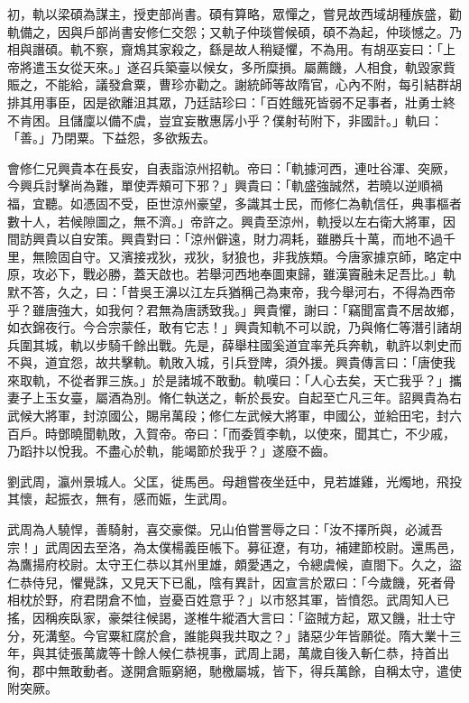 \begin{pinyinscope}
 初，軌以梁碩為謀主，授吏部尚書。碩有算略，眾憚之，嘗見故西域胡種族盛，勸軌備之，因與戶部尚書安修仁交怨；又軌子仲琰嘗候碩，碩不為起，仲琰憾之。乃相與譖碩。軌不察，齎鴆其家殺之，繇是故人稍疑懼，不為用。有胡巫妄曰：「上帝將遣玉女從天來。」遂召兵築臺以候女，多所糜損。屬薦饑，人相食，軌毀家貲賑之，不能給，議發倉粟，曹珍亦勸之。謝統師等故隋官，心內不附，每引結群胡排其用事臣，因是欲離沮其眾，乃廷詰珍曰：「百姓餓死皆弱不足事者，壯勇士終不肯困。且儲廩以備不虞，豈宜妄散惠孱小乎？僕射茍附下，非國計。」軌曰：「善。」乃閉粟。下益怨，多欲叛去。



 會修仁兄興貴本在長安，自表詣涼州招軌。帝曰：「軌據河西，連吐谷渾、突厥，今興兵討擊尚為難，單使弄頰可下邪？」興貴曰：「軌盛強誠然，若曉以逆順禍福，宜聽。如憑固不受，臣世涼州豪望，多識其士民，而修仁為軌信任，典事樞者數十人，若候隙圖之，無不濟。」帝許之。興貴至涼州，軌授以左右衛大將軍，因間訪興貴以自安策。興貴對曰：「涼州僻遠，財力凋耗，雖勝兵十萬，而地不過千里，無險固自守。又濱接戎狄，戎狄，豺狼也，非我族類。今唐家據京師，略定中原，攻必下，戰必勝，蓋天啟也。若舉河西地奉圖東歸，雖漢竇融未足吾比。」軌默不答，久之，曰：「昔吳王濞以江左兵猶稱己為東帝，我今舉河右，不得為西帝乎？雖唐強大，如我何？君無為唐誘致我。」興貴懼，謝曰：「竊聞富貴不居故鄉，如衣錦夜行。今合宗蒙任，敢有它志！」興貴知軌不可以說，乃與脩仁等潛引諸胡兵圍其城，軌以步騎千餘出戰。先是，薛舉柱國奚道宜率羌兵奔軌，軌許以刺史而不與，道宜怨，故共擊軌。軌敗入城，引兵登陴，須外援。興貴傳言曰：「唐使我來取軌，不從者罪三族。」於是諸城不敢動。軌嘆曰：「人心去矣，天亡我乎？」攜妻子上玉女臺，屬酒為別。脩仁執送之，斬於長安。自起至亡凡三年。詔興貴為右武候大將軍，封涼國公，賜帛萬段；修仁左武候大將軍，申國公，並給田宅，封六百戶。時鄧曉聞軌敗，入賀帝。帝曰：「而委質李軌，以使來，聞其亡，不少戚，乃蹈抃以悅我。不盡心於軌，能竭節於我乎？」遂廢不齒。



 劉武周，瀛州景城人。父匡，徙馬邑。母趙嘗夜坐廷中，見若雄雞，光燭地，飛投其懷，起振衣，無有，感而娠，生武周。



 武周為人驍悍，善騎射，喜交豪傑。兄山伯嘗詈辱之曰：「汝不擇所與，必滅吾宗！」武周因去至洛，為太僕楊義臣帳下。募征遼，有功，補建節校尉。還馬邑，為鷹揚府校尉。太守王仁恭以其州里雄，頗愛遇之，令總虞候，直閤下。久之，盜仁恭侍兒，懼覺誅，又見天下已亂，陰有異計，因宣言於眾曰：「今歲饑，死者骨相枕於野，府君閉倉不恤，豈憂百姓意乎？」以市怒其軍，皆憤怨。武周知人已搖，因稱疾臥家，豪桀往候謁，遂椎牛縱酒大言曰：「盜賊方起，眾又饑，壯士守分，死溝壑。今官粟紅腐於倉，誰能與我共取之？」諸惡少年皆願從。隋大業十三年，與其徒張萬歲等十餘人候仁恭視事，武周上謁，萬歲自後入斬仁恭，持首出徇，郡中無敢動者。遂開倉賑窮絕，馳檄屬城，皆下，得兵萬餘，自稱太守，遣使附突厥。




\end{pinyinscope}
